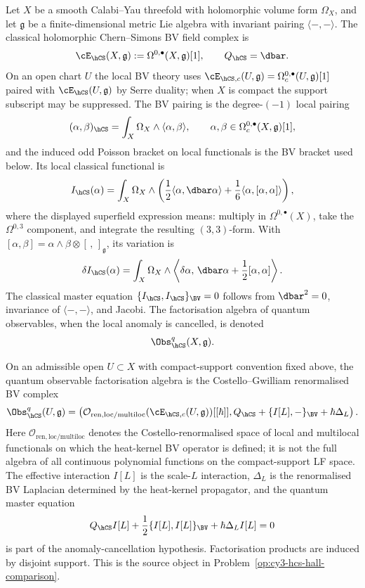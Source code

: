 \begin{definition}
\label{def:cy3-hcs-bv-complex}
Let $X$ be a smooth Calabi--Yau threefold with holomorphic volume form
$\Omega_X$, and let $\mathfrak g$ be a finite-dimensional metric Lie
algebra with invariant pairing $\langle-,-\rangle$. The classical
holomorphic Chern--Simons BV field complex is
\[
 \cE_{\hCS}(X,\mathfrak g)
 :=
 \Omega^{0,\bullet}(X,\mathfrak g)[1],
 \qquad
 Q_{\hCS}=\dbar .
\]
On an open chart $U$ the local BV theory uses
$\cE_{\hCS,c}(U,\mathfrak g)=\Omega_c^{0,\bullet}(U,\mathfrak g)[1]$
paired with $\cE_{\hCS}(U,\mathfrak g)$ by Serre duality; when $X$ is
compact the support subscript may be suppressed.
The BV pairing is the degree-$(-1)$ local pairing
\[
 (\alpha,\beta)_{\hCS}
 =
 \int_X \Omega_X\wedge \langle \alpha,\beta\rangle ,
 \qquad
 \alpha,\beta\in\Omega^{0,\bullet}_c(X,\mathfrak g)[1],
\]
and the induced odd Poisson bracket on local functionals is the BV
bracket used below.
Its local classical functional is
\[
 I_{\hCS}(\alpha)
 =
 \int_X \Omega_X \wedge
 \left(
 \frac{1}{2}\langle \alpha,\dbar\alpha\rangle
 +
 \frac{1}{6}\langle \alpha,[\alpha,\alpha]\rangle
 \right),
\]
where the displayed superfield expression means: multiply in
$\Omega^{0,\bullet}(X)$, take the $\Omega^{0,3}$ component, and integrate
the resulting $(3,3)$-form. With
$[\alpha,\beta]=\alpha\wedge\beta\otimes[\,,\,]_{\mathfrak g}$, its
variation is
\[
 \delta I_{\hCS}(\alpha)
 =
 \int_X\Omega_X\wedge
 \left\langle
 \delta\alpha,\,
 \dbar\alpha+\frac{1}{2}[\alpha,\alpha]
 \right\rangle .
\]
The classical master equation
$\{I_{\hCS},I_{\hCS}\}_{\BV}=0$ follows from $\dbar^2=0$, invariance of
$\langle-,-\rangle$, and Jacobi. The factorisation algebra of quantum
observables, when the local anomaly is cancelled, is denoted
\[
 \Obs_{\hCS}^{q}(X,\mathfrak g).
\]
\end{definition}

\begin{definition}
\label{def:cy3-hcs-quantum-observables}
On an admissible open $U\subset X$ with compact-support convention fixed
above, the quantum observable factorisation algebra is the
Costello--Gwilliam renormalised BV complex
\[
 \Obs_{\hCS}^{q}(U,\mathfrak g)
 =
 \left(
 \mathcal O_{\mathrm{ren,loc/multiloc}}
 (\cE_{\hCS,c}(U,\mathfrak g))[[\hbar]],
 Q_{\hCS}+\{I[L],-\}_{\BV}+\hbar\Delta_L
 \right).
\]
Here $\mathcal O_{\mathrm{ren,loc/multiloc}}$ denotes the
Costello-renormalised space of local and multilocal functionals on which
the heat-kernel BV operator is defined; it is not the full algebra of
all continuous polynomial functions on the compact-support LF space.
The effective interaction $I[L]$ is the scale-$L$ interaction,
$\Delta_L$ is the renormalised BV Laplacian determined by the
heat-kernel propagator, and the quantum master equation
\[
 Q_{\hCS} I[L]
 +\frac{1}{2}\{I[L],I[L]\}_{\BV}
 +\hbar\Delta_L I[L]
 =0
\]
is part of the anomaly-cancellation hypothesis. Factorisation products
are induced by disjoint support. This is the source object in
Problem~\ref{op:cy3-hcs-hall-comparison}.
\end{definition}

